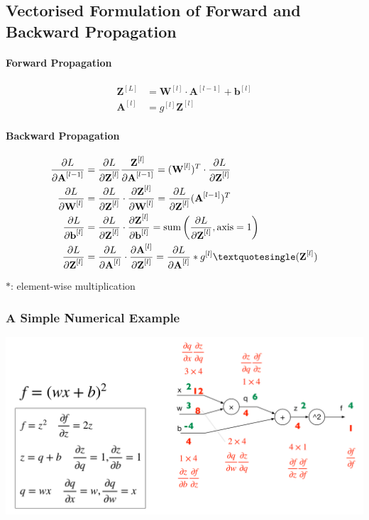 \documentclass[11pt]{article}
\begin{document}
\subsection{Vectorised Formulation of Forward and Backward Propagation}

\paragraph{Forward Propagation}
\begin{align*}
	\textbf{Z}^{[L]} &= \textbf{W}^{[l]}\cdot\textbf{A}^{[l-1]}+\textbf{b}^{[l]}\\
	\textbf{A}^{[l]} &= g^{[l]} \textbf{Z}^{[l]}
\end{align*}

\paragraph{Backward Propagation}
\begin{align*}
	\frac{\partial L}{\partial \textbf{A}^{[l-1]}} &= \frac{\partial L}{\partial \textbf{Z}^{[l]}}\frac{\textbf{Z}^{[l]}}{\partial \textbf{A}^{[l-1]}} = (\textbf{W}^{[l]})^T\cdot\frac{\partial L}{\partial \textbf{Z}^{[l]}}\\
	\frac{\partial L}{\partial \textbf{W}^{[l]}} &= \frac{\partial L}{\partial \textbf{Z}^{[l]}} \cdot \frac{\partial \textbf{Z}^{[l]}}{\partial \textbf{W}^{[l]}} = \frac{\partial L}{\partial \textbf{Z}^{[l]}}(\textbf{A}^{[l-1]})^T\\
	\frac{\partial L}{\partial \textbf{b}^{[l]}} &= \frac{\partial L}{\partial \textbf{Z}^{[l]}} \cdot \frac{\partial \textbf{Z}^{[l]}}{\partial \textbf{b}^{[l]}} = \text{sum}\left(\frac{\partial L}{\partial \textbf{Z}^{[l]}}, \text{axis}=1\right)\\
	\frac{\partial L}{\partial \textbf{Z}^{[l]}} &= \frac{\partial L}{\partial \textbf{A}^{[l]}}\cdot\frac{\partial \textbf{A}^{[l]}}{\partial \textbf{Z}^{[l]}} = \frac{\partial L}{\partial \textbf{A}^{[l]}} \ast g^{[l]}\textquotesingle(\textbf{Z}^{[l]})
\end{align*}

$\ast$: element-wise multiplication

\subsubsection{A Simple Numerical Example}

\includegraphics[width=\linewidth,keepaspectratio]{forward_backward_propagation_numerical_example}
\end{document}
